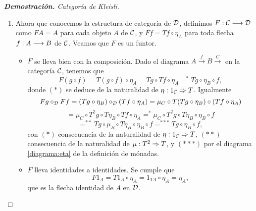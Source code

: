 \begin{proof}[\textbf{Demostración. } Categoría de Kleisli]
\begin{enumerate}
\begin{itemize}
    Esto muestra que en la categoría $\D$, la flecha $\eta_A$ es la
    identidad del objeto $A$ para cualquier objeto $A$ de la categoría.
    \end{itemize}
  \item Ahora que conocemos la estructura de categoría
    de $\D$, definimos $F : \mathcal{C}\longrightarrow \mathcal{D}$ como $FA = A$
    para cada objeto $A$ de $\mathcal{C}$, y $Ff = Tf \circ \eta_A$ para
    toda flecha $f: A\longrightarrow B$ de $\mathcal{C}$.
    Veamos que $F$ es un funtor.
    \begin{itemize}
    \item $F$ se lleva bien con la composición. Dado el diagrama
      $A \xrightarrow{f} B \xrightarrow{C}$ en la categoría $\mathcal{C}$,
      tenemos que
      $$F(g \circ f) = T(g \circ f) \circ \eta_A
      = Tg \circ Tf \circ \eta_A
      =^* Tg \circ \eta_B \circ f,$$
      donde $(*)$ se deduce de la naturalidad de
      $\eta : 1_{\mathcal{C}}\Rightarrow T$. Igualmente
      $$Fg \circ_{\mathcal{D}} Ff = (Tg \circ \eta_B) \circ_{\mathcal{D}} (Tf \circ \eta_A)
      = \mu_C \circ T(Tg \circ \eta_B) \circ (Tf \circ \eta_A)$$
      $$= \mu_C \circ T^2g \circ T\eta_B \circ Tf \circ \eta_A
      =^* \mu_C \circ T^2g \circ T\eta_B \circ \eta_B \circ f$$
      $$=^{**} Tg \circ \mu_B \circ T\eta_B \circ \eta_B \circ f
      =^{***} Tg \circ \eta_B \circ f,$$
      con $(*)$ consecuencia de la naturalidad de
      $\eta: 1_{\mathcal{C}}\Rightarrow T$, $(**)$ consecuencia de la naturalidad
      de $\mu : T^2\Rightarrow T$, y $(***)$ por el diagrama
      \eqref{diagrama:eta} de la definición de mónadas.


    \item $F$ lleva identidades a identidades. Se cumple que
      $$F1_A = T1_A \circ \eta_A = 1_{TA} \circ \eta_A = \eta_A,$$
      que es la flecha identidad de $A$ en $\D$.
    \end{itemize}


\end{enumerate}
\end{proof}
